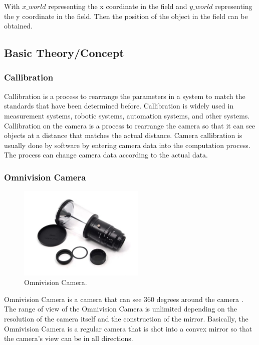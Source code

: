 With $x\_world$ representing the x coordinate in the field and $y\_world$ representing the y coordinate in the field. Then the position of the object in the field can be obtained.

\subsection{Basic Theory/Concept}

\subsubsection{Callibration}
\label{sec:callibration}

Callibration is a process to rearrange the parameters in a system to match the standards that have been determined before. Callibration is widely used in measurement systems, robotic systems, automation systems, and other systems. Callibration on the camera is a process to rearrange the camera so that it can see objects at a distance that matches the actual distance. Camera callibration is usually done by software by entering camera data into the computation process. The process can change camera data according to the actual data.

\subsubsection{Omnivision Camera}
\label{sec:omnivision}
\begin{figure}[ht]
    \centering
    \includegraphics[width=6cm]{gambar/omnivisino2.jpeg}
    \caption{Omnivision Camera.}
    \label{fig:omnivision}
\end{figure}

Omnivision Camera is a camera that can see 360 degrees around the camera \citet{ref_kamera_omni}. The range of view of the Omnivision Camera is unlimited depending on the resolution of the camera itself and the construction of the mirror. Basically, the Omnivision Camera is a regular camera that is shot into a convex mirror so that the camera's view can be in all directions.

